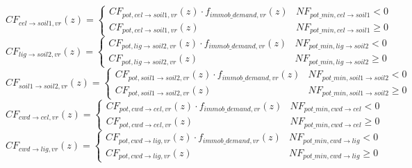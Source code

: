 \begin{equation}
CF_{cel \rightarrow { soil1,vr }}(z)=\left\{\begin{array}{ll}CF_{pot, cel \rightarrow { soil1,vr }}(z) \cdot f_{immob\_{demand, vr}}(z) & NF_{pot\_{min, cel \rightarrow {soil1}}}<0 \\ 
CF_{pot, cel \rightarrow { soil1,vr }}(z) & NF_{pot\_{min,cel } \rightarrow { soil1 }} \geq 0
\end{array}\right.
\end{equation}
\begin{equation}
CF_{{lig } \rightarrow { soil2,vr }}(z)=\left\{\begin{array}{ll}C F_{pot, lig \rightarrow { soil2,vr }}(z) \cdot f_{immob\_{demand, vr}}(z) & NF_{pot\_{min, lig \rightarrow { soil2 }}} <0 \\ 
CF_{pot, lig \rightarrow { soil2,vr }}(z) &  NF_{pot\_{min, lig \rightarrow { soil2}}} \geq 0
  \end{array}\right.
\end{equation}
\begin{equation}
    C F_{{soil1 } \rightarrow { soil2,vr }}(z)=\left\{\begin{array}{ll}C F_{pot, soil1 \rightarrow { soil2,vr }}(z) \cdot f_{immob\_demand, vr}(z) & NF_{pot\_{min, soil1 \rightarrow soil2 }}<0 \\ 
    CF_{pot, soil1 \rightarrow { soil2,vr }}(z) & NF_{pot\_{min, soil1 \rightarrow { soil2}}} \geq 0
  \end{array}\right.
\end{equation}
\begin{equation}
CF_{cwd \rightarrow cel, vr}(z)=\left\{\begin{array}{ll} CF_{pot, cwd \rightarrow cel, vr}(z) \cdot f_{immob\_demand, vr}(z) & NF_{pot\_{min, cwd \rightarrow cel}} <0 \\ 
CF_{pot, cwd \rightarrow cel, vr}(z) & NF_{pot\_{min, cwd \rightarrow cel}} \geq 0
  \end{array}\right.
\end{equation}
\begin{equation}
CF_{cwd \rightarrow lig, vr}(z)=\left\{\begin{array}{ll} CF_{pot, cwd \rightarrow lig, vr}(z) \cdot f_{immob\_demand, vr}(z) & NF_{pot\_{min, cwd \rightarrow lig}} <0 \\ 
CF_{pot, cwd \rightarrow lig, vr}(z) & NF_{pot\_{min, cwd \rightarrow lig}} \geq 0
  \end{array}\right.
\end{equation}

